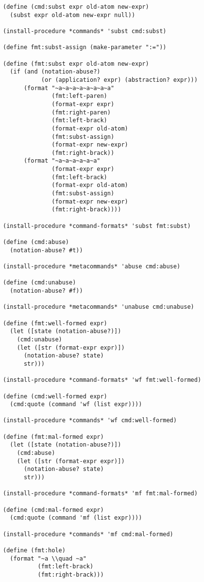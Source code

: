 \begin{lstlisting}[language=racket]
(define (cmd:subst expr old-atom new-expr)
  (subst expr old-atom new-expr null))

(install-procedure *commands* 'subst cmd:subst)

(define fmt:subst-assign (make-parameter ":="))

(define (fmt:subst expr old-atom new-expr)
  (if (and (notation-abuse?)
           (or (application? expr) (abstraction? expr)))
      (format "~a~a~a~a~a~a~a~a"
              (fmt:left-paren)
              (format-expr expr)
              (fmt:right-paren)
              (fmt:left-brack)
              (format-expr old-atom)
              (fmt:subst-assign)
              (format-expr new-expr)
              (fmt:right-brack))
      (format "~a~a~a~a~a~a"
              (format-expr expr)
              (fmt:left-brack)
              (format-expr old-atom)
              (fmt:subst-assign)
              (format-expr new-expr)
              (fmt:right-brack))))

(install-procedure *command-formats* 'subst fmt:subst)

(define (cmd:abuse)
  (notation-abuse? #t))

(install-procedure *metacommands* 'abuse cmd:abuse)

(define (cmd:unabuse)
  (notation-abuse? #f))

(install-procedure *metacommands* 'unabuse cmd:unabuse)

(define (fmt:well-formed expr)
  (let ([state (notation-abuse?)])
    (cmd:unabuse)
    (let ([str (format-expr expr)])
      (notation-abuse? state)
      str)))

(install-procedure *command-formats* 'wf fmt:well-formed)

(define (cmd:well-formed expr)
  (cmd:quote (command 'wf (list expr))))

(install-procedure *commands* 'wf cmd:well-formed)

(define (fmt:mal-formed expr)
  (let ([state (notation-abuse?)])
    (cmd:abuse)
    (let ([str (format-expr expr)])
      (notation-abuse? state)
      str)))

(install-procedure *command-formats* 'mf fmt:mal-formed)

(define (cmd:mal-formed expr)
  (cmd:quote (command 'mf (list expr))))

(install-procedure *commands* 'mf cmd:mal-formed)

(define (fmt:hole)
  (format "~a \\quad ~a"
          (fmt:left-brack)
          (fmt:right-brack)))


\end{lstlisting}
